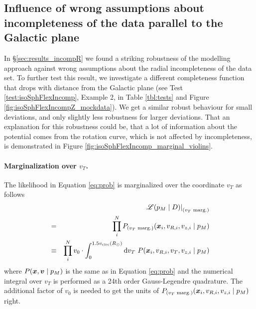 \subsection{Influence of wrong assumptions about incompleteness of the data parallel to the Galactic plane} \label{sec:incompZ}

In \S\ref{sec:results_incompR} we found a striking robustness of the \RM modelling approach against wrong assumptions about the radial incompleteness of the data set. To further test this result, we investigate a different completeness function that drops with distance from the Galactic plane (see Test \ref{test:isoSphFlexIncomp}, Example 2, in Table \ref{tbl:tests} and Figure \ref{fig:isoSphFlexIncompZ_mockdata}). We get a similar robust behaviour for small deviations, and only slightly less robustness for larger deviations. That an explanation for this robustness could be, that a lot of information about the potential comes from the rotation curve, which is not affected by incompleteness, is demonstrated in Figure \ref{fig:isoSphFlexIncomp_marginal_violins}.

\paragraph{Marginalization over $v_T$.} The likelihood in Equation \ref{eq:prob} is marginalized over the coordinate $v_T$ as follows
\begin{eqnarray*}
&&\left. \mathscr{L}(p_M \mid D)\right|_\text{($v_T$ marg.)}\\
&=& \prod_i^N P_\text{($v_T$ marg.)} (\boldsymbol{x}_i,v_{R,i},v_{z,i} \mid p_M)\\
&\equiv& \prod_i^N v_0 \cdot \int_0^{1.5v_\text{circ}(R_\odot)} \mathop{}\!\mathrm{d} v_T \ P(\boldsymbol{x}_i,v_{R,i},v_{T},v_{z,i} \mid p_M )
\end{eqnarray*}
where $P(\boldsymbol{x},\boldsymbol{v} \mid p_M)$ is the same as in Equation \ref{eq:prob} and the numerical integral over $v_T$ is performed as a 24th order Gauss-Legendre quadrature. The additional factor of $v_0$ is needed to get the units of $P_\text{($v_T$ marg.)} (\boldsymbol{x}_i,v_{R,i},v_{z,i} \mid p_M)$ right.


